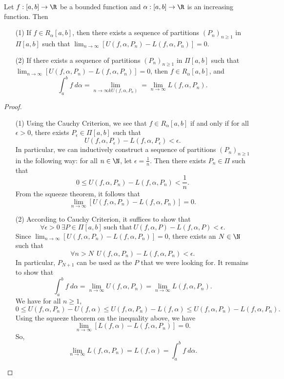 \begin{theorem}
    Let \( f: [a,b] \to \R  \) be a bounded function and \( \alpha: [a,b] \to \R  \) is an increasing function. Then
    \begin{enumerate}
        \item[(1)] If \( f \in {R}_{\alpha}[a,b]  \), then there exists a sequence of partitions \( ({P}_{n})_{n \geq 1}  \) in \( \Pi [a,b] \) such that \( \lim_{ n \to \infty  }  [U(f,\alpha, {P}_{n}) - L(f,\alpha, {P}_{n}) ] = 0  \).
        \item[(2)] If there exists a sequence of partitions \( ({P}_{n})_{n \geq 1} \) in \( \Pi [a,b] \) such that \( \lim_{ n \to \infty  } [U(f,\alpha, {P}_{n}) - L(f,\alpha, {P}_{n})] = 0  \), then \( f \in {R}_{\alpha}[a,b] \), and 
            \[  \int_{ a }^{ b }  f  \ d \alpha = \lim_{ n \to \infty k U(f,\alpha, {P}_{n}) }  = \lim_{ n \to \infty  }  L(f,\alpha, {P}_{n}).  \]
    \end{enumerate}
\end{theorem}
\begin{proof}
\begin{enumerate}
    \item[(1)] Using the Cauchy Criterion, we see that \( f \in {R}_{\alpha}[a,b] \) if and only if for all \( \epsilon > 0  \), there exists \( {P}_{\epsilon} \in \Pi [a,b] \) such that 
        \[  U(f,\alpha,{P}_{\epsilon}) - L(f,\alpha, {P}_{\epsilon})  < \epsilon. \]
        In particular, we can inductively construct a sequence of partitions \( ({P}_{n})_{n \geq 1 } \) in the following way: for all \( n \in \N \), let \( \epsilon = \frac{ 1 }{ n }  \). Then there exists \( {P}_{n} \in \Pi  \) such that  
        \[   0 \leq U(f,\alpha, {P}_{n}) - L(f,\alpha, {P}_{n}) < \frac{ 1 }{ n }.  \]
       From the squeeze theorem, it follows that  
       \[  \lim_{ n \to \infty  } [U(f,\alpha, {P}_{n}) - L(f,\alpha, {P}_{n})] = 0.  \]
    \item[(2)] According to Cauchy Criterion, it suffices to show that 
        \[  \forall \epsilon > 0 \ \exists P \in \Pi [a,b] \ \text{such that} \ U(f,\alpha,P) - L(f,\alpha,P) < \epsilon. \]
        Since \( \lim_{ n \to \infty  } [U(f,\alpha, {P}_{n}) - L(f,\alpha, {P}_{n})] = 0  \), there exists an \( N \in \N \) such that 
        \[  \forall n > N \ \ U(f,\alpha,{P}_{n}) - L(f,\alpha,{P}_{n}) < \epsilon. \]
        In particular, \( {P}_{N+1} \) can be used as the \( P  \) that we were looking for. It remains to show that 
        \[  \int_{ a }^{ b }  f  \ d \alpha = \lim_{ n \to \infty  }  U(f,\alpha,{P}_{n}) = \lim_{ n \to \infty  }  L(f,\alpha, {P}_{n}). \]
        We have for all \( n \geq 1  \), 
        \[  0 \leq U(f,\alpha,{P}_{n}) - U(f,\alpha) \leq U(f,\alpha, {P}_{n}) - L(f,\alpha) \leq U(f,\alpha, {P}_{n}) - L(f,\alpha, {P}_{n}). \]
        Using the squeeze theorem on the inequality above, we have 
        \[  \lim_{ n \to \infty  } [L(f,\alpha) - L(f,\alpha,{P}_{n})] = 0.  \]
        So, 
        \[  \lim_{ n \to \infty  } L(f,\alpha,{P}_{n}) = L(f,\alpha) = \int_{ a }^{ b }  f  \ d \alpha. \]
\end{enumerate}
\end{proof}

